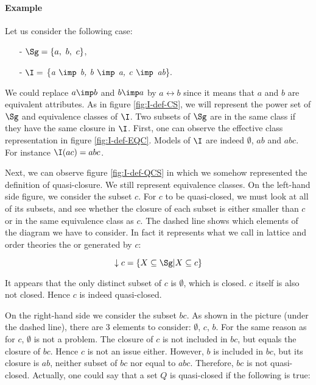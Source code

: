 \paragraph{Example} Let us consider the following case:
\begin{itemize}
	\item[-] $\Sg = \{a, \ b, \ c \}$,
	\item[-] $\I = $ \{\textit{a $\imp$ b, b $\imp$ a, c $\imp$ ab}\}.
\end{itemize}
We could replace $a \imp b$ and $b \imp a$ by $ a \longleftrightarrow b$ since it means that $a$ and $b$ are equivalent attributes. As in figure \ref{fig:I-def-CS}, we will represent the power set of $\Sg$ and 
equivalence classes of $\I$. Two subsets of $\Sg$ are in the same class if they
have the same closure in $\I$. First, one can observe the effective class 
representation in figure \ref{fig:I-def-EQC}. Models of $\I$ are indeed 
$\emptyset$, $ab$ and $abc$. For instance $\I(ac) = abc$.

\vspace{1.2em}

\begin{figure}[ht]
	
\end{figure}

Next, we can observe figure \ref{fig:I-def-QCS} in which we somehow represented 
the definition of quasi-closure. We still represent equivalence classes. On
the left-hand side figure, we consider the subset $c$. For $c$ to be 
quasi-closed, we must look at all of its subsets, and see whether the closure
of each subset is either smaller than $c$ or in the same equivalence class
as $c$. The dashed line shows which elements of the diagram we have to 
consider. In fact it represents what we call in lattice and order theories the 
 or  generated by $c$:

	\[ \downarrow c = \{ X \subseteq \Sg | X \subseteq c \} \] 

It appears that the only distinct subset of $c$ is $\emptyset$, which is 
closed. $c$ itself is also not closed. Hence $c$ is indeed quasi-closed. 

\vspace{1.2em}

\begin{figure}[ht]
	
\end{figure}

On the right-hand side we consider the subset $bc$. As shown in the picture 
(under the dashed line), there are 3 elements to consider: $\emptyset$, $c$, 
$b$. For the same reason as for $c$, $\emptyset$ is not a problem. The closure
of $c$ is not included in $bc$, but equals the closure of $bc$. Hence $c$ is
not an issue either. However, $b$ is included in $bc$, but its closure is $ab$,
neither subset of $bc$ nor equal to $abc$. Therefore, $bc$ is not quasi-closed.
Actually, one could say that a set $Q$ is quasi-closed if the following is true:


